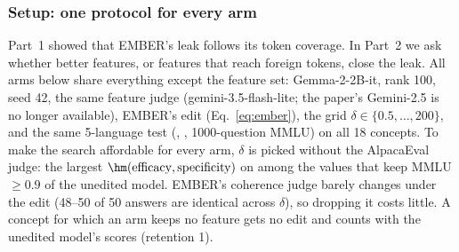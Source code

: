 
\subsubsection{Setup: one protocol for every arm}
\label{sec:fair}

Part~1 showed that EMBER's leak follows its token coverage.
In Part~2 we ask whether better features, or features that reach foreign tokens, close the leak.
All arms below share everything except the feature set: Gemma-2-2B-it, rank 100, seed 42, the same feature judge (gemini-3.5-flash-lite; the paper's Gemini-2.5 is no longer available), EMBER's edit (Eq.~\ref{eq:ember}), the grid $\delta \in \{0.5,\dots,200\}$, and the same 5-language test (\qatest{}, \simtest{}, 1000-question MMLU) on all 18 concepts.
To make the search affordable for every arm, $\delta$ is picked without the AlpacaEval judge: the largest $\hm(\text{efficacy},\text{specificity})$ on \qatrain{} among the values that keep MMLU $\geq 0.9$ of the unedited model.
EMBER's coherence judge barely changes under the edit (48--50 of 50 answers are identical across $\delta$), so dropping it costs little.
A concept for which an arm keeps no feature gets no edit and counts with the unedited model's scores (retention 1).

